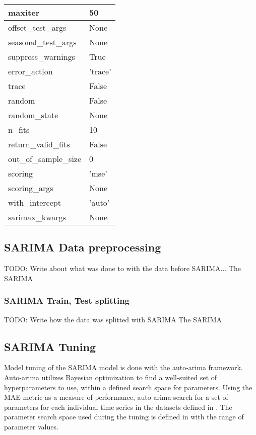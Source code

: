 \begin{table}[h]
\begin{tabular}{|l|l|}
    maxiter                & 50      \\ \hline
    offset\_test\_args     & None    \\ \hline
    seasonal\_test\_args   & None    \\ \hline
    suppress\_warnings     & True    \\ \hline
    error\_action          & 'trace' \\ \hline
    trace                  & False   \\ \hline
    random                 & False   \\ \hline
    random\_state          & None    \\ \hline
    n\_fits                & 10      \\ \hline
    return\_valid\_fits    & False   \\ \hline
    out\_of\_sample\_size  & 0       \\ \hline
    scoring                & 'mse'   \\ \hline
    scoring\_args          & None    \\ \hline
    with\_intercept        & 'auto'  \\ \hline
    sarimax\_kwargs        & None    \\ \hline
  \end{tabular}
\end{table}

\subsection{SARIMA Data preprocessing}
TODO: Write about what was done to with the data before SARIMA...
The SARIMA
\subsubsection{SARIMA Train, Test splitting}
TODO: Write how the data was splitted with SARIMA
The SARIMA

\subsection{SARIMA Tuning}
Model tuning of the SARIMA model is done with the auto-arima framework.
Auto-arima utilizes Bayesian optimization to find a well-suited set of hyperparameters to use,
within a defined search space for parameters.
Using the MAE metric as a measure of performance, auto-arima search for a set of parameters for each individual time series
in the datasets defined in .
The parameter search space used during the tuning is defined in  with the range of parameter values.

